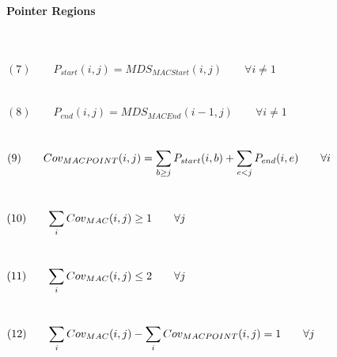 \paragraph{Pointer Regions} $ $
\\\\\\
$(7) \qquad P_{start}(i,j) = MDS_{MACStart}(i,j) \qquad \forall i \neq 1$ \\\\\\
$(8) \qquad P_{end}(i,j) = MDS_{MACEnd}(i-1,j) \qquad \forall i \neq 1$ \\\\\\
$(9) \qquad Cov_{MACPOINT}(i,j) = \mathlarger{\sum_{b \geq j} P_{start}(i,b) + \sum_{e < j} P_{end}(i,e) \qquad \forall i}$ \\\\\\
$(10) \qquad \mathlarger{\sum_{i} Cov_{MAC}(i,j) \geq 1 \qquad \forall j }$ \\\\\\
$(11) \qquad \mathlarger{\sum_{i} Cov_{MAC}(i,j) \leq 2 \qquad \forall j }$ \\\\\\
$(12) \qquad \mathlarger{\sum_{i} Cov_{MAC}(i,j) - \sum_{i} Cov_{MACPOINT}(i,j) = 1 \qquad \forall j}$ \\\\\\

